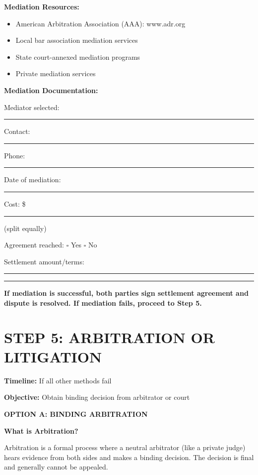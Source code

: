 \documentclass[11pt,letterpaper]{article}
\begin{document}
\vspace{6pt}

\textbf{Mediation Resources:}

\begin{itemize}[leftmargin=0.5in]
\item American Arbitration Association (AAA): www.adr.org
\item Local bar association mediation services
\item State court-annexed mediation programs
\item Private mediation services
\end{itemize}

\vspace{6pt}

\textbf{Mediation Documentation:}

Mediator selected: \rule{7cm}{0.4pt}

Contact: \rule{7cm}{0.4pt} Phone: \rule{3cm}{0.4pt}

Date of mediation: \rule{4cm}{0.4pt}

Cost: \$ \rule{3cm}{0.4pt} (split equally)

Agreement reached: $\square$ Yes $\square$ No

Settlement amount/terms: \rule{7cm}{0.4pt}

\rule{14cm}{0.4pt}

\vspace{6pt}

\textbf{If mediation is successful, both parties sign settlement agreement and dispute is resolved. If mediation fails, proceed to Step 5.}

\newpage

\section*{STEP 5: ARBITRATION OR LITIGATION}

\textbf{Timeline:} If all other methods fail

\textbf{Objective:} Obtain binding decision from arbitrator or court

\vspace{6pt}

\textbf{OPTION A: BINDING ARBITRATION}

\textbf{What is Arbitration?}

Arbitration is a formal process where a neutral arbitrator (like a private judge) hears evidence from both sides and makes a binding decision. The decision is final and generally cannot be appealed.
\end{document}
